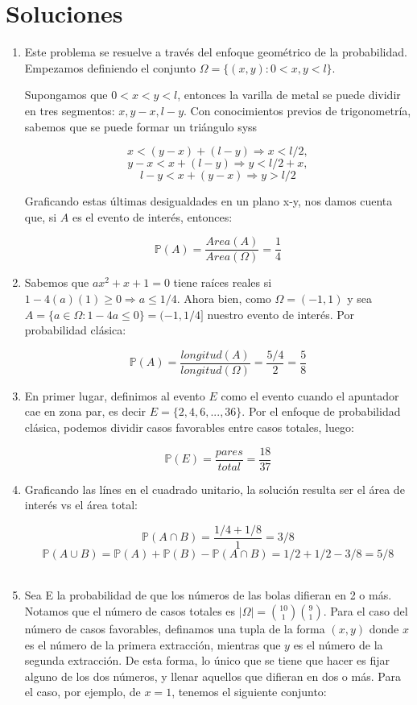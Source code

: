\documentclass[a4paper]{article}
\begin{document}
\section*{Soluciones}
\begin{enumerate}
    \item Este problema se resuelve a través del enfoque geométrico de la probabilidad. Empezamos definiendo el conjunto $\Omega = \{ (x,y): 0 < x, y < l \}.$
    
    Supongamos que $0 < x < y < l$, entonces la varilla de metal se puede dividir en tres segmentos: $x, y-x, l-y$. Con conocimientos previos de trigonometría, sabemos que se puede formar un triángulo syss 
    
    \[ x < (y-x)+(l-y) \Rightarrow x < l/2, \]
    \[y-x < x+(l-y) \Rightarrow y < l/2 + x, \]
    \[l-y < x + (y-x) \Rightarrow y > l/2 \]
    
    Graficando estas últimas desigualdades en un plano x-y, nos damos cuenta que, si $A$ es el evento de interés, entonces:
    
    \[ \mathbb{P}(A) = \frac{Area(A)}{Area(\Omega)} = \frac{1}{4}\]
    
    \item Sabemos que $ax^2 + x + 1 = 0$ tiene raíces reales si $1-4(a)(1) \ge 0 \Rightarrow a \le 1/4.$ Ahora bien, como $\Omega = (-1,1)$ y sea $A = \{ a \in \Omega: 1-4a \le 0 \} = (-1, 1/4]$ nuestro evento de interés. Por probabilidad clásica:
    
    \[ \mathbb{P}(A) = \frac{longitud(A)}{longitud(\Omega)} = \frac{5/4}{2} = \frac{5}{8}\]
    
    \item En primer lugar, definimos al evento $E$ como el evento cuando el apuntador cae en zona par, es decir $E = \{2,4,6,...,36\}.$ Por el enfoque de probabilidad clásica, podemos dividir casos favorables entre casos totales, luego: 
    
    \[ \mathbb{P}(E) = \frac{pares}{total} = \frac{18}{37}\]
    
    \item Graficando las línes en el cuadrado unitario, la solución resulta ser el área de interés vs el área total:
    
    \[\mathbb{P}(A \cap B) = \frac{1/4 + 1/8}{1} = 3/8\]
    \[\mathbb{P}(A \cup B) = \mathbb{P}(A) + \mathbb{P}(B) - \mathbb{P}(A \cap B) = 1/2 + 1/2 - 3/8 = 5/8 \]\
    
    \item Sea E la probabilidad de que los números de las bolas difieran en 2 o más. Notamos que el número de casos totales es $| \Omega | = \binom{10}{1} \binom{9}{1}$. Para el caso del número de casos favorables, definamos una tupla de la forma $(x,y)$ donde $x$ es el número de la primera extracción, mientras que $y$ es el número de la segunda extracción. De esta forma, lo único que se tiene que hacer es fijar alguno de los dos números, y llenar aquellos que difieran en dos o más. Para el caso, por ejemplo, de $x = 1$, tenemos el siguiente conjunto:
    

\end{enumerate}
\end{document}
